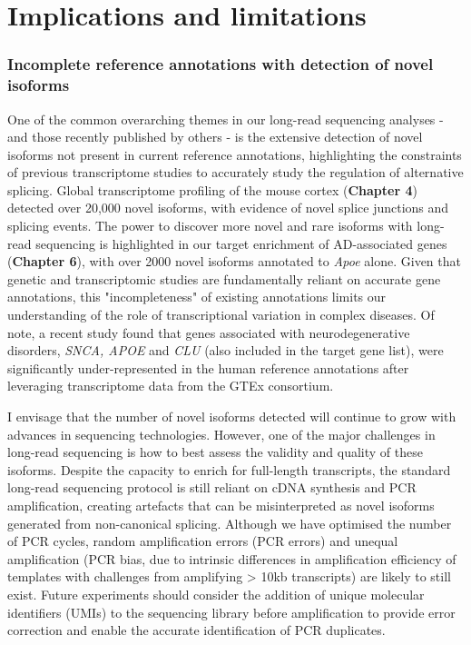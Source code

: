 \section{Implications and limitations}

\subsubsection{Incomplete reference annotations with detection of novel isoforms} 
\label{ch7: artefacts}
One of the common overarching themes in our long-read sequencing analyses - and those recently published by others - is the extensive detection of novel isoforms not present in current reference annotations, highlighting the constraints of previous transcriptome studies to accurately study the regulation of alternative splicing. Global transcriptome profiling of the mouse cortex (\textbf{Chapter 4}) detected over 20,000 novel isoforms, with evidence of novel splice junctions and splicing events. The power to discover more novel and rare isoforms with long-read sequencing is highlighted in our target enrichment of AD-associated genes (\textbf{Chapter 6}), with over 2000 novel isoforms annotated to \textit{Apoe} alone. Given that genetic and transcriptomic studies are fundamentally reliant on accurate gene annotations, this "incompleteness" of existing annotations limits our understanding of the role of transcriptional variation in complex diseases. Of note, a recent study found that genes associated with neurodegenerative disorders, \textit{SNCA, APOE} and \textit{CLU} (also included in the target gene list), were significantly under-represented in the human reference annotations after leveraging transcriptome data from the GTEx consortium\cite{Zhang2020b}.  

I envisage that the number of novel isoforms detected will continue to grow with advances in sequencing technologies. However, one of the major challenges in long-read sequencing is how to best assess the validity and quality of these isoforms. Despite the capacity to enrich for full-length transcripts, the standard long-read sequencing protocol is still reliant on cDNA synthesis and PCR amplification, creating artefacts that can be misinterpreted as novel isoforms generated from non-canonical splicing. Although we have optimised the number of PCR cycles, random amplification errors (PCR errors) and unequal amplification (PCR bias, due to intrinsic differences in amplification efficiency of templates with challenges from amplifying > 10kb transcripts) are likely to still exist. Future experiments should consider the addition of unique molecular identifiers (UMIs) to the sequencing library before amplification to provide error correction and enable the accurate identification of PCR duplicates\cite{Fu2018}.  

